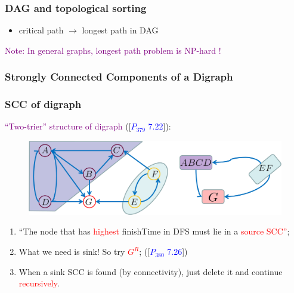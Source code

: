 \begin{frame}
  \frametitle{DAG and topological sorting}
  
  \begin{itemize}
    \item critical path $\to$ longest path in DAG
  \end{itemize}
  
  \pause
  \vspace{0.50cm}
  
  \textcolor{purple}{Note: In general graphs, longest path problem is NP-hard !}
    
\end{frame}

\subsubsection{Strongly Connected Components of a Digraph}

\begin{frame}
  \frametitle{SCC of digraph}

  \textcolor{purple}{``Two-trier'' structure of digraph} ([\textcolor{blue}{$P_{379}$ 7.22}]):

  \begin{figure}
    \includegraphics[scale=0.35]{figure/bfs_dfs/SCCDI}
    \label{fig:scc}
  \end{figure}

  \pause

{\small

  \begin{enumerate}
    \item ``The node that has \textcolor{red}{highest} finishTime in DFS must lie in a \textcolor{red}{source SCC''};
    \pause
    \item What we need is sink! So try \textcolor{red}{$G^R$}; ([\textcolor{blue}{$P_{380}$ 7.26}])
    \item When a sink SCC is found (by connectivity), just delete it and continue \textcolor{red}{recursively}.
  \end{enumerate}
}

\end{frame}


